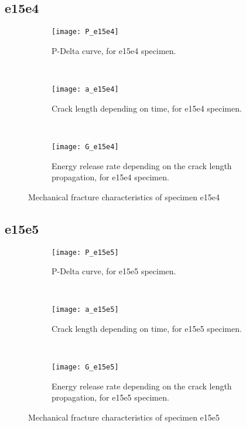 \subsection{e15e4}

\begin{figure}[H]
	\centering
	\begin{subfigure}{0.48\linewidth}
		\centering
		\texttt{[image: P\_e15e4]}
		\decoRule
		\caption{P-Delta curve, for e15e4 specimen.}
		\label{fig:P_e15e3}
	\end{subfigure}
	\hfill \\
	\begin{subfigure}{0.48\linewidth}
		\centering
		\texttt{[image: a\_e15e4]}
		\decoRule
		\caption{Crack length depending on time, for e15e4 specimen.}
		\label{fig:a_e15e4}
	\end{subfigure}
	\hfill\\
	\begin{subfigure}{0.48\linewidth}
		\centering
		\texttt{[image: G\_e15e4]}
		\decoRule
		\caption{Energy release rate depending on the crack length propagation, for e15e4 specimen.}
		\label{fig:G_e15e4}
	\end{subfigure}
	\caption{Mechanical fracture characteristics of specimen e15e4}
	\label{e15e4}
\end{figure}

\subsection{e15e5}

\begin{figure}[H]
	\centering
	\begin{subfigure}{0.48\linewidth}
		\centering
		\texttt{[image: P\_e15e5]}
		\decoRule
		\caption{P-Delta curve, for e15e5 specimen.}
		\label{fig:P_e15e5}
	\end{subfigure}
	\hfill \\
	\begin{subfigure}{0.48\linewidth}
		\centering
		\texttt{[image: a\_e15e5]}
		\decoRule
		\caption{Crack length depending on time, for e15e5 specimen.}
		\label{fig:a_e15e5}
	\end{subfigure}
	\hfill\\
	\begin{subfigure}{0.48\linewidth}
		\centering
		\texttt{[image: G\_e15e5]}
		\decoRule
		\caption{Energy release rate depending on the crack length propagation, for e15e5 specimen.}
		\label{fig:G_e15e5}
	\end{subfigure}
	\caption{Mechanical fracture characteristics of specimen e15e5}
	\label{e15e5}
\end{figure}



